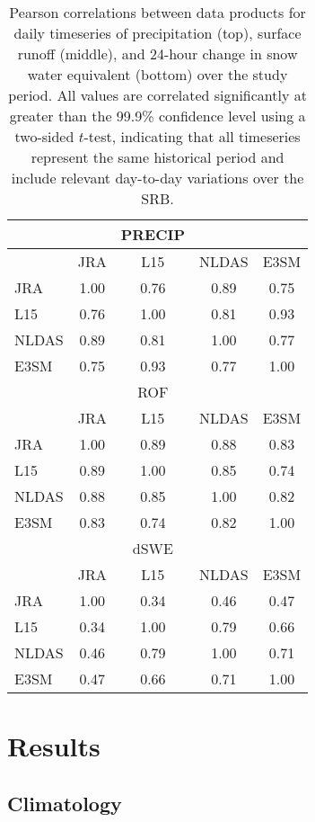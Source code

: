 \documentclass[nhess, manuscript]{copernicus}
\begin{document}
\begin{table}[]
\caption{Pearson correlations between data products for daily timeseries of precipitation (top), surface runoff (middle), and 24-hour change in snow water equivalent (bottom) over the study period. All values are correlated significantly at greater than the 99.9\% confidence level using a two-sided $t$-test, indicating that all timeseries represent the same historical period and include relevant day-to-day variations over the SRB.}
\begin{tabular}{lcccc}
 \hline
      &      & PRECIP &       &       \\ \hline
      & JRA  & L15    & NLDAS & E3SM \\
JRA   & 1.00 & 0.76   & 0.89  & 0.75 \\
L15   & 0.76 & 1.00   & 0.81  & 0.93 \\
NLDAS & 0.89 & 0.81   & 1.00  & 0.77 \\
E3SM  & 0.75 & 0.93   & 0.77  & 1.00  \\ \hline \hline
      &      & ROF    &       &      \\ \hline
      & JRA  & L15    & NLDAS & E3SM \\
JRA   & 1.00 & 0.89   & 0.88  & 0.83 \\
L15   & 0.89 & 1.00   & 0.85  & 0.74 \\
NLDAS & 0.88 & 0.85   & 1.00  & 0.82 \\
E3SM  & 0.83 & 0.74   & 0.82  & 1.00 \\ \hline \hline
      &      & dSWE   &       &      \\ \hline
      & JRA  & L15    & NLDAS & E3SM \\
JRA   & 1.00 & 0.34   & 0.46  & 0.47 \\
L15   & 0.34 & 1.00   & 0.79  & 0.66 \\
NLDAS & 0.46 & 0.79   & 1.00  & 0.71 \\
E3SM  & 0.47 & 0.66   & 0.71  & 1.00 \\ \hline \hline
\end{tabular}
\label{table:correlations}
\end{table}

\section{Results}

\subsection{Climatology}
\end{document}
